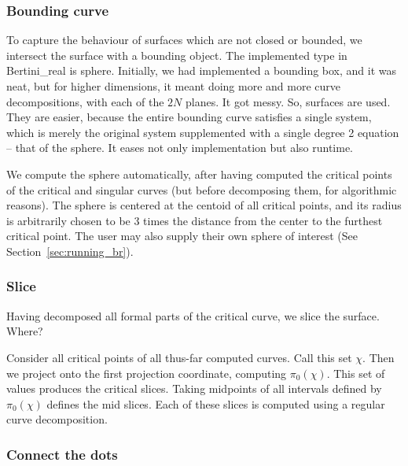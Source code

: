\subsubsection{Bounding curve}

To capture the behaviour of surfaces which are not closed or bounded, we intersect the surface with a bounding object.  The implemented type in Bertini\_real is sphere.  Initially, we had implemented a bounding box, and it was neat, but for higher dimensions, it meant doing more and more curve decompositions, with each of the $2N$ planes.  It got messy.  So, surfaces are used.  They are easier, because the entire bounding curve satisfies a single system, which is merely the original system supplemented with a single degree 2 equation -- that of the sphere.  It eases not only implementation but also runtime.

We compute the sphere automatically, after having computed the critical points of the critical and singular curves (but before decomposing them, for algorithmic reasons).  The sphere is centered at the centoid of all critical points, and its radius is arbitrarily chosen to be 3 times the distance from the center to the furthest critical point.  The user may also supply their own sphere of interest (See Section~\ref{sec:running_br}).




\subsubsection{Slice}


Having decomposed all formal parts of the critical curve, we slice the surface.  Where?  

Consider all critical points of all thus-far computed curves.  Call this set $\chi$.  Then we project onto the first projection coordinate, computing $\pi_0(\chi)$.  This set of values produces the critical slices.  Taking midpoints of all intervals defined by $\pi_0(\chi)$ defines the mid slices.  Each of these slices is computed using a regular curve decomposition.





\subsubsection{Connect the dots}
\label{sec:connect_surface}

